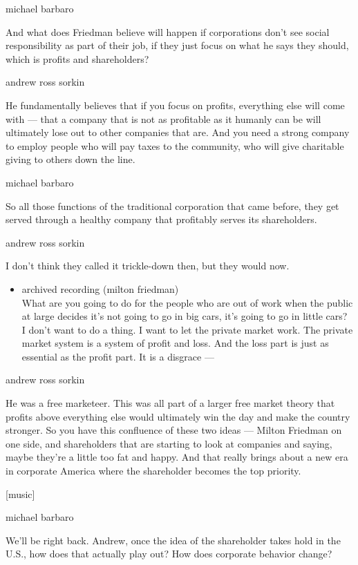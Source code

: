 michael barbaro

And what does Friedman believe will happen if corporations don't see
social responsibility as part of their job, if they just focus on what
he says they should, which is profits and shareholders?

andrew ross sorkin

He fundamentally believes that if you focus on profits, everything else
will come with --- that a company that is not as profitable as it
humanly can be will ultimately lose out to other companies that are. And
you need a strong company to employ people who will pay taxes to the
community, who will give charitable giving to others down the line.

michael barbaro

So all those functions of the traditional corporation that came before,
they get served through a healthy company that profitably serves its
shareholders.

andrew ross sorkin

I don't think they called it trickle-down then, but they would now.

\begin{itemize}
\tightlist
\item
  archived recording (milton friedman)\\
  What are you going to do for the people who are out of work when the
  public at large decides it's not going to go in big cars, it's going
  to go in little cars? I don't want to do a thing. I want to let the
  private market work. The private market system is a system of profit
  and loss. And the loss part is just as essential as the profit part.
  It is a disgrace ---
\end{itemize}

andrew ross sorkin

He was a free marketeer. This was all part of a larger free market
theory that profits above everything else would ultimately win the day
and make the country stronger. So you have this confluence of these two
ideas --- Milton Friedman on one side, and shareholders that are
starting to look at companies and saying, maybe they're a little too fat
and happy. And that really brings about a new era in corporate America
where the shareholder becomes the top priority.

{[}music{]}

michael barbaro

We'll be right back. Andrew, once the idea of the shareholder takes hold
in the U.S., how does that actually play out? How does corporate
behavior change?

